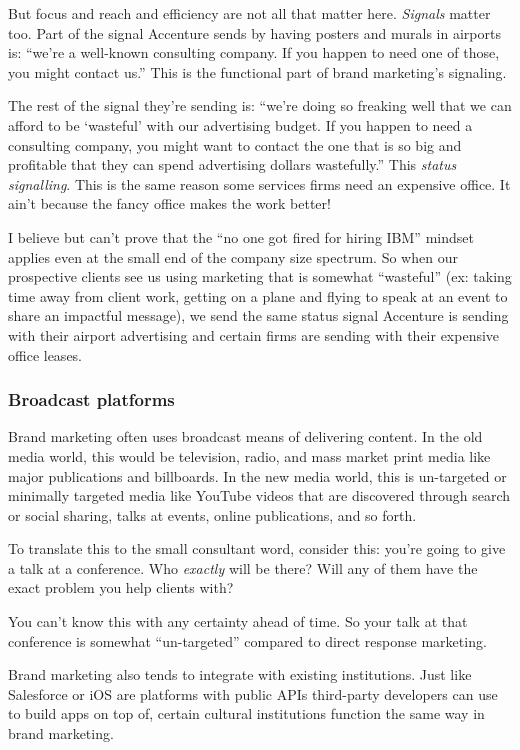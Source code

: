 \documentclass[13pt,]{tufte-handout}
\begin{document}
But focus and reach and efficiency are not all that matter here.
\emph{Signals} matter too. Part of the signal Accenture sends by having
posters and murals in airports is: ``we're a well-known consulting
company. If you happen to need one of those, you might contact us.''
This is the functional part of brand marketing's signaling.

The rest of the signal they're sending is: ``we're doing so freaking
well that we can afford to be `wasteful' with our advertising budget. If
you happen to need a consulting company, you might want to contact the
one that is so big and profitable that they can spend advertising
dollars wastefully.'' This \emph{status signalling}. This is the same
reason some services firms need an expensive office. It ain't because
the fancy office makes the work better!

I believe but can't prove that the ``no one got fired for hiring IBM''
mindset applies even at the small end of the company size spectrum. So
when our prospective clients see us using marketing that is somewhat
``wasteful'' (ex: taking time away from client work, getting on a plane
and flying to speak at an event to share an impactful message), we send
the same status signal Accenture is sending with their airport
advertising and certain firms are sending with their expensive office
leases.

\hypertarget{broadcast-platforms}{%
\subsubsection{Broadcast platforms}\label{broadcast-platforms}}

Brand marketing often uses broadcast means of delivering content. In the
old media world, this would be television, radio, and mass market print
media like major publications and billboards. In the new media world,
this is un-targeted or minimally targeted media like YouTube videos that
are discovered through search or social sharing, talks at events, online
publications, and so forth.

To translate this to the small consultant word, consider this: you're
going to give a talk at a conference. Who \emph{exactly} will be there?
Will any of them have the exact problem you help clients with?

You can't know this with any certainty ahead of time. So your talk at
that conference is somewhat ``un-targeted'' compared to direct response
marketing.

Brand marketing also tends to integrate with existing institutions. Just
like Salesforce or iOS are platforms with public APIs third-party
developers can use to build apps on top of, certain cultural
institutions function the same way in brand marketing.
\end{document}
